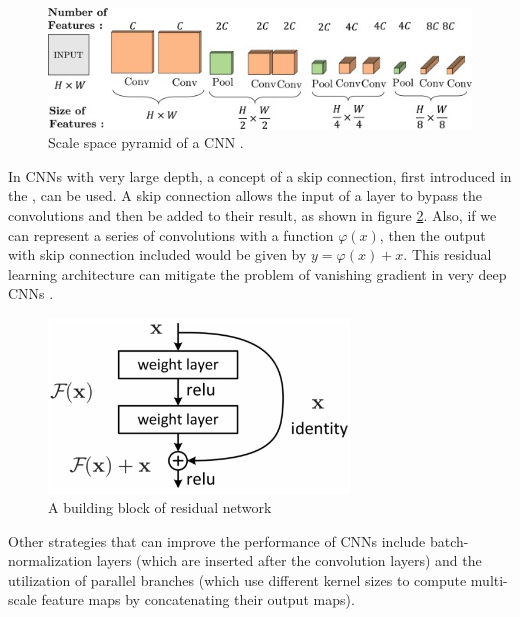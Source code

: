 \begin{figure}[H]
\begin{centering}
\includegraphics[width=12cm]{assets/images/cnn-layers.jpg}
\par\end{centering}
\caption{Scale space pyramid of a CNN \cite{Santosh2022-3}.}
\label{fig:cnn-layers}
\end{figure}

In CNNs with very large depth, a concept of a skip connection, first introduced in the \cite{He2016}, can be used. A skip connection allows the input of a layer to bypass the convolutions and then be added to their result, as shown in figure \ref{fig:skip-conn}. Also, if we can represent a series of convolutions with a function $\varphi(x)$, then the output with skip connection included would be given by $y=\varphi(x) + x$. This residual learning architecture can mitigate the problem of vanishing gradient in very deep CNNs \cite{Santosh2022-2}.

\begin{figure}[H]
\begin{centering}
\includegraphics[width=8cm]{assets/images/skip-conn.png}
\par\end{centering}
\caption{A building block of residual network \cite{He2016}}
\label{fig:skip-conn}
\end{figure}

Other strategies that can improve the performance of CNNs include batch-normalization layers \cite{Ioffe2015}(which are inserted after the convolution layers) and the utilization of parallel branches \cite{Szegedy2015} (which use different kernel sizes to compute multi-scale feature maps by concatenating their output maps).

